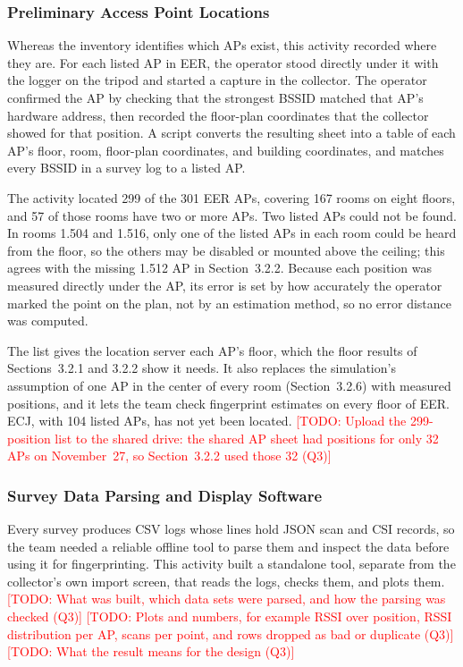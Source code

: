\documentclass[12pt,letterpaper]{article}
\newcommand{\TODO}[1]{\textcolor{red}{[TODO: #1]}}
\begin{document}
\subsubsection{Preliminary Access Point Locations}
Whereas the inventory identifies which APs exist, this activity recorded where they are. For each
listed AP in EER, the operator stood directly under it with the logger on the tripod and started a
capture in the collector. The operator confirmed the AP by checking that the strongest BSSID matched
that AP's hardware address, then recorded the floor-plan coordinates that the collector showed for
that position. A script converts the resulting sheet into a table of each AP's floor, room,
floor-plan coordinates, and building coordinates, and matches every BSSID in a survey log to a listed
AP.

The activity located 299 of the 301 EER APs, covering 167 rooms on eight floors, and 57 of those rooms
have two or more APs. Two listed APs could not be found. In rooms 1.504 and 1.516, only one of the
listed APs in each room could be heard from the floor, so the others may be disabled or mounted above
the ceiling; this agrees with the missing 1.512 AP in Section~3.2.2. Because each position was
measured directly under the AP, its error is set by how accurately the operator marked the point on
the plan, not by an estimation method, so no error distance was computed.

The list gives the location server each AP's floor, which the floor results of Sections~3.2.1 and
3.2.2 show it needs. It also replaces the simulation's assumption of one AP in the center of every
room (Section~3.2.6) with measured positions, and it lets the team check fingerprint estimates on
every floor of EER. ECJ, with 104 listed APs, has not yet been located. \TODO{Upload the
299-position list to the shared drive: the shared AP sheet had positions for only 32 APs on
November~27, so Section~3.2.2 used those 32 (Q3)}

\subsubsection{Survey Data Parsing and Display Software}
Every survey produces CSV logs whose lines hold JSON scan and CSI records, so the team needed a
reliable offline tool to parse them and inspect the data before using it for fingerprinting. This
activity built a standalone tool, separate from the collector's own import screen, that reads the
logs, checks them, and plots them. \TODO{What was built, which data sets were parsed, and how the
parsing was checked (Q3)} \TODO{Plots and numbers, for example RSSI over position, RSSI distribution
per AP, scans per point, and rows dropped as bad or duplicate (Q3)} \TODO{What the result means for
the design (Q3)}
\end{document}
